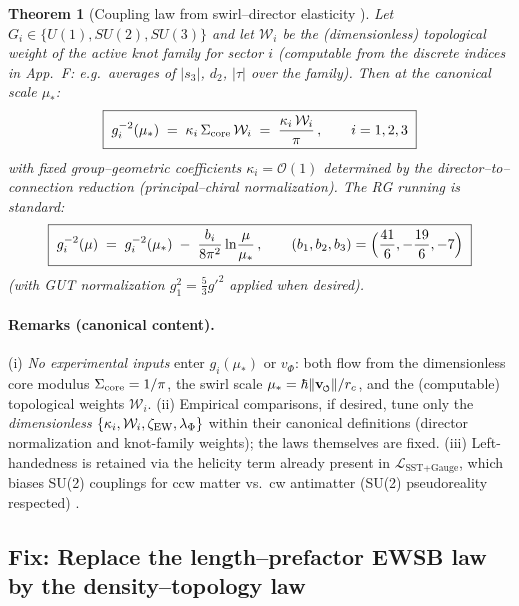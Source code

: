 \documentclass[11pt]{article}
\newcommand{\swirlarrow}{%
     \mathchoice{\mkern-2mu\scriptstyle\boldsymbol{\circlearrowleft}}%
                {\mkern-2mu\scriptstyle\boldsymbol{\circlearrowleft}}%
                {\mkern-2mu\scriptscriptstyle\boldsymbol{\circlearrowleft}}%
                {\mkern-2mu\scriptscriptstyle\boldsymbol{\circlearrowleft}}%
}
\newcommand{\vswirl}{\mathbf{v}_{\swirlarrow}}
\newcommand{\vnorm}{\lVert \vswirl \rVert}               %
\newcommand{\rc}{r_c}                                    %
\newtheorem{theorem}{Theorem}[section]
\begin{document}
        \begin{theorem}[Coupling law from swirl–director elasticity \cite{YangMills1954,PeskinSchroeder,PDG2024}]
        Let $G_i\!\in\!\{U(1),SU(2),SU(3)\}$ and let $\mathcal{W}_i$ be the (dimensionless) topological weight of the active knot family for sector $i$
        (computable from the discrete indices in App.~F: e.g.\ averages of $|s_3|$, $d_2$, $|\tau|$ over the family).
        Then at the canonical scale $\mu_\ast$:
        \[
            \boxed{\;
            g_i^{-2}(\mu_\ast)\;=\; \kappa_i\,\Sigma_{\rm core}\,\mathcal{W}_i
            \;=\;\frac{\kappa_i\,\mathcal{W}_i}{\pi}\,,
                \qquad i=1,2,3
                \;}
        \]
        with fixed group–geometric coefficients $\kappa_i=\mathcal{O}(1)$ determined by the director–to–connection reduction (principal–chiral normalization).
        The RG running is standard:
        \[
            \boxed{\;
            g_i^{-2}(\mu)\;=\;g_i^{-2}(\mu_\ast)\;-\;\frac{b_i}{8\pi^2}\ln\!\frac{\mu}{\mu_\ast}\,,
                \qquad
                (b_1,b_2,b_3)=\Bigl(\frac{41}{6},-\frac{19}{6},-7\Bigr)
                \;}
        \]
        (with GUT normalization $g_1^2=\tfrac{5}{3}g'^2$ applied when desired).
        \end{theorem}



    \paragraph{Remarks (canonical content).}
    (i) \emph{No experimental inputs} enter $g_i(\mu_\ast)$ or $v_\Phi$: both flow from the dimensionless core modulus $\Sigma_{\rm core}=1/\pi$, the swirl scale $\mu_\ast=\hbar\vnorm/\rc$, and the (computable) topological weights $\mathcal{W}_i$.
        (ii) Empirical comparisons, if desired, tune only the \emph{dimensionless} $\{\kappa_i,\mathcal{W}_i,\zeta_{\rm EW},\lambda_\Phi\}$ within their canonical definitions (director normalization and knot-family weights); the laws themselves are fixed.
        (iii) Left-handedness is retained via the helicity term already present in $\mathcal{L}_{\text{SST+Gauge}}$, which biases SU(2) couplings for ccw matter vs.\ cw antimatter (SU(2) pseudoreality respected) \cite{Witten1982}.


\subsection*{Fix: Replace the length–prefactor EWSB law by the density–topology law}
\end{document}
